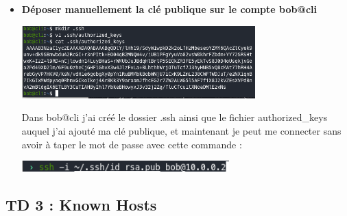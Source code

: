 \documentclass[12pt]{article}
\begin{document}
\begin{itemize}
  \item \textbf{Déposer manuellement la clé publique sur le compte bob@cli}
  \vspace{0.3cm}

  \includegraphics[width=9cm]{images/screen-ssh-td2-4.png}
  \vspace{0.3cm}

  Dans bob@cli j'ai créé le dossier .ssh ainsi que le fichier authorized\_keys auquel j'ai ajouté ma clé publique,
  et maintenant je peut me connecter sans avoir à taper le mot de passe avec cette commande : \newline

  \includegraphics[width=8cm]{images/screen-ssh-td2-5.png}
  \vspace{0.3cm}

\end{itemize}
\vspace{0.3cm}

  \subsection{TD 3 : Known Hosts}
  \vspace{0.3cm}
\end{document}
